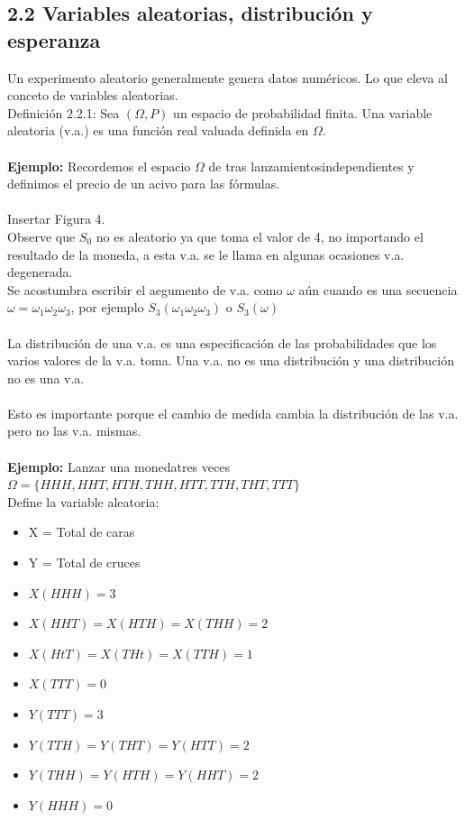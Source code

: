 \documentclass{article}
\begin{document}
        \subsection{2.2 Variables aleatorias, distribución y esperanza}
        Un experimento aleatorio generalmente genera datos numéricos.
        Lo que eleva al conceto de variables aleatorias.
        \\
        Definición 2.2.1: Sea $(\Omega,P)$ un espacio de probabilidad finita.
        Una variable aleatoria (v.a.) es una función real valuada definida en $\Omega$.
        \\
        \\
        \textbf{Ejemplo:} Recordemos el espacio $\Omega$ de tras lanzamientosindependientes y definimos el precio de un acivo para las fórmulas.
        \\
        \\
        Insertar Figura 4.
        \\
        Observe que $S_0$ no es aleatorio ya que toma el valor de 4, 
        no importando el resultado de la moneda, a esta v.a. se le
        llama en algunas ocasiones v.a. degenerada.
        \\
        Se acostumbra escribir el aegumento de v.a. como $\omega$ aún cuando es
        una secuencia $\omega = \omega_1 \omega_2 \omega_3$, por 
        ejemplo $S_3(\omega_1 \omega_2 \omega_3)$ o $S_3(\omega)$
        \\
        \\
        La distribución de una v.a. es una especificación de las probabilidades
        que los varios valores de la v.a. toma.
        Una v.a. no es una distribución y una distribución no es una v.a.
        \\
        \\
        Esto es importante porque el cambio de medida cambia la
        distribución de las v.a. pero no las v.a. mismas.
        \\
        \\
        \textbf{Ejemplo: }Lanzar una monedatres veces
        \\
        $\Omega = \lbrace HHH, HHT, HTH, THH, HTT, TTH, THT, TTT \rbrace$
        \\
        Define la variable aleatoria:
        \begin{itemize}
            \item X = Total de caras
            \item Y = Total de cruces
            \item $X(HHH) = 3$
            \item $X(HHT) = X(HTH) = X(THH) = 2$
            \item $X(HtT) = X(THt) = X(TTH) = 1$
            \item $X(TTT) = 0$
            \item $Y(TTT) = 3$
            \item $Y(TTH) = Y(THT) = Y(HTT) = 2$
            \item $Y(THH) = Y(HTH) = Y(HHT) = 2$
            \item $Y(HHH) = 0$
        \end{itemize}
\end{document}
